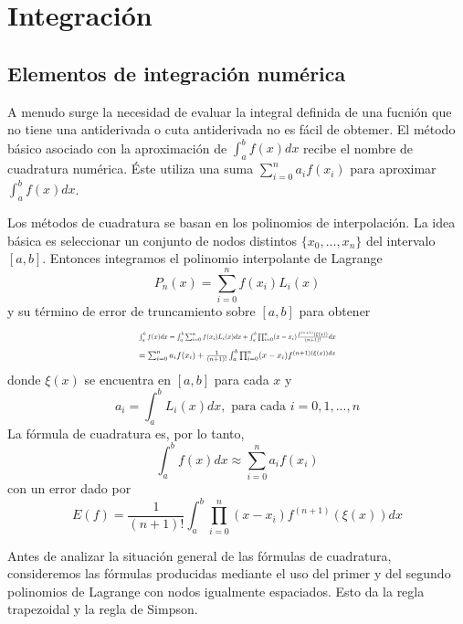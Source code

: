 \chapter{Integración}
\section{Elementos de integración numérica}
A menudo surge la necesidad de evaluar la integral definida de una fucnión que no tiene una antiderivada o cuta antiderivada no es fácil de obtemer. El método básico asociado con la aproximación de $\int_{a}^{b} f(x) dx$ recibe el nombre de cuadratura numérica. Éste utiliza una suma $\sum_{i = 0}^{n} a_i f(x_i)$ para aproximar $\int_{a}^{b} f(x) dx$.

Los métodos de cuadratura se basan en los polinomios de interpolación. La idea básica es seleccionar un conjunto de nodos distintos $\{x_0, ..., x_n\}$ del intervalo $[a, b]$. Entonces integramos el polinomio interpolante de Lagrange
\[ P_n(x) = \sum_{i = 0}^{n} f(x_i) L_i(x) \]
y su término de error de truncamiento sobre $[a, b]$ para obtener
\begin{multline*}
    \resizebox{0.45 \textwidth}{!}{$
    \int_{a}^{b} f(x) dx = \int_{a}^{b} \sum_{i = 0}^{n} f(x_i) L_i(x) dx + \int_{a}^{b} \prod_{i = 0}^{n} (x - x_i) \frac{f^{(n + 1)} (\xi(x))}{(n + 1)!} dx
    $} \\
    \resizebox{0.45 \textwidth}{!}{$
    = \sum_{i = 0}^{n} a_i f(x_i) + \frac{1}{(n + 1)!} \int_{a}^{b} \prod_{i = 0}^{n} (x - x_i) f^{(n + 1) (\xi(x)) dx}
    $} 
\end{multline*}
donde $\xi(x)$ se encuentra en $[a, b]$ para cada $x$ y
\[ a_i = \int_{a}^{b}L_i(x)dx, \text{ para cada } i = 0, 1,..., n\]
La fórmula de cuadratura es, por lo tanto,
\[ \int_{a}^{b} f(x) dx  \approx \sum_{i = 0}^{n} a_i f(x_i) \]
con un error dado por 
\[ E(f) = \frac{1}{(n + 1)!} \int_{a}^{b} \prod_{i = 0}^{n} (x - x_i) f^{(n + 1)} (\xi(x)) dx\]

Antes de analizar la situación general de las fórmulas de cuadratura, consideremos las fórmulas producidas mediante el uso del primer y del segundo polinomios de Lagrange con nodos igualmente espaciados. Esto da la regla trapezoidal y la regla de Simpson.

